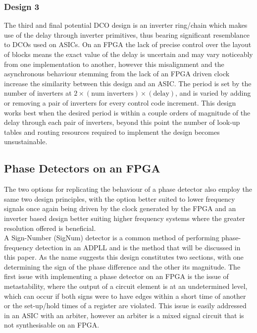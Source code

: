 \documentclass[conference]{IEEEtran}
\begin{document}
\subsubsection*{Design 3}
The third and final potential DCO design is an inverter ring/chain which makes use of the delay through inverter primitives, thus bearing significant resemblance to DCOs used on ASICs. On an FPGA the lack of precise control over the layout of blocks means the exact value of the delay is uncertain and may vary noticeably from one implementation to another, however this misalignment and the asynchronous behaviour stemming from the lack of an FPGA driven clock increase the similarity between this design and an ASIC. The period is set by the number of inverters at $2\times(\textrm{num inverters})\times(\textrm{delay})$, and is varied by adding or removing a pair of inverters for every control code increment. This design works best when the desired period is within a couple orders of magnitude of the delay through each pair of inverters, beyond this point the number of look-up tables and routing resources required to implement the design becomes unsustainable.

\subsection{Phase Detectors on an FPGA}
The two options for replicating the behaviour of a phase detector also employ the same two design principles, with the option better suited to lower frequency signals once again being driven by the clock generated by the FPGA and an inverter based design better suiting higher frequency systems where the greater resolution offered is beneficial.\\
A  Sign-Number (SigNum) detector is a common method of performing phase-frequency detection in an ADPLL and is the method that will be discussed in this paper. As the name suggests this design constitutes two sections, with one determining the sign of the phase difference and the other its magnitude. The first issue with implementing a phase detector on an FPGA is the issue of metastability, where the output of a circuit element is at an undetermined level, which can occur if both signs were to have edges within a short time of another or the set-up/hold times of a register are violated. This issue is easily addressed in an ASIC with an arbiter, however an arbiter is a mixed signal circuit that is not synthesisable on an FPGA.
\end{document}
